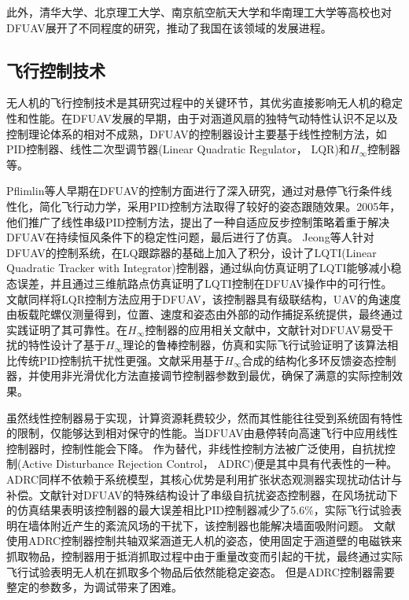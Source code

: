 此外，清华大学\cite{chou2021study,luoNumericalAnalysisWind2024a}、北京理工大学\cite{manzoorCompoundLearningBasedModel2024}、南京航空航天大学\cite{caiNumericalPredictionUnsteady2022,1025281784.nh}和华南理工大学\cite{yinDuctedFanUAV2024,1022766347.nh}等高校也对DFUAV展开了不同程度的研究，推动了我国在该领域的发展进程。

\subsection{飞行控制技术}

无人机的飞行控制技术是其研究过程中的关键环节，其优劣直接影响无人机的稳定性和性能。在DFUAV发展的早期，由于对涵道风扇的独特气动特性认识不足以及控制理论体系的相对不成熟，DFUAV的控制器设计主要基于线性控制方法，如PID控制器、线性二次型调节器(Linear Quadratic Regulator， LQR)和$H_{\infty}$控制器等。

Pflimlin等人早期在DFUAV的控制方面进行了深入研究\cite{pflimlinAerodynamicModelingPractical2007,pflimlinModelingAttitudeControl2010a}，通过对悬停飞行条件线性化，简化飞行动力学，采用PID控制方法取得了较好的姿态跟随效果。2005年，他们推广了线性串级PID控制方法，提出了一种自适应反步控制策略着重于解决DFUAV在持续恒风条件下的稳定性问题，最后进行了仿真\cite{pflimlinPositionControlDucted2007b}。
Jeong等人针对DFUAV的控制系统，在LQ跟踪器的基础上加入了积分，设计了LQTI(Linear Quadratic Tracker with Integrator)控制器，通过纵向仿真证明了LQTI能够减小稳态误差，并且通过三维航路点仿真证明了LQTI控制在DFUAV操作中的可行性\cite{jeong2015control}。
文献\parencite{muehlebachFlyingPlatformTestbed2017}同样将LQR控制方法应用于DFUAV，该控制器具有级联结构，UAV的角速度由板载陀螺仪测量得到，位置、速度和姿态由外部的动作捕捉系统提供，最终通过实践证明了其可靠性。在$H_{\infty}$控制器的应用相关文献中，文献\parencite{DJKZ201009016}针对DFUAV易受干扰的特性设计了基于$H_{\infty}$理论的鲁棒控制器，仿真和实际飞行试验证明了该算法相比传统PID控制抗干扰性更强。文献\parencite{fanModellingAttitudeController2018}采用基于$H_{\infty}$合成的结构化多环反馈姿态控制器，并使用非光滑优化方法直接调节控制器参数到最优，确保了满意的实际控制效果。

虽然线性控制器易于实现，计算资源耗费较少，然而其性能往往受到系统固有特性的限制，仅能够达到相对保守的性能\cite{manzoor2022flight}。当DFUAV由悬停转向高速飞行中应用线性控制器时，控制性能会下降\cite{saeedSurveyHybridUnmanned2018}。
作为替代，非线性控制方法被广泛使用，自抗扰控制(Active Disturbance Rejection Control， ADRC)便是其中具有代表性的一种。ADRC同样不依赖于系统模型，其核心优势是利用扩张状态观测器实现扰动估计与补偿。文献\parencite{DGKQ202408003}针对DFUAV的特殊结构设计了串级自抗扰姿态控制器，在风场扰动下的仿真结果表明该控制器的最大误差相比PID控制器减少了5.6\%，实际飞行试验表明在墙体附近产生的紊流风场的干扰下，该控制器也能解决墙面吸附问题。
文献\parencite{yinDuctedFanUAV2024}使用ADRC控制器控制共轴双桨涵道无人机的姿态，使用固定于涵道壁的电磁铁来抓取物品，控制器用于抵消抓取过程中由于重量改变而引起的干扰，最终通过实际飞行试验表明无人机在抓取多个物品后依然能稳定姿态。
但是ADRC控制器需要整定的参数多，为调试带来了困难。

